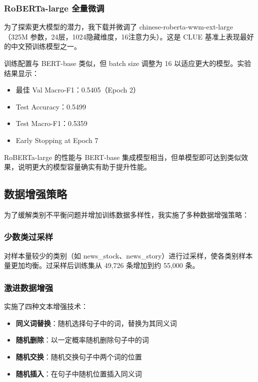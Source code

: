\documentclass[a4paper]{article}
\begin{document}
\subsubsection{RoBERTa-large 全量微调}

为了探索更大模型的潜力，我下载并微调了 chinese-roberta-wwm-ext-large（325M 参数，24层，1024隐藏维度，16注意力头）。这是 CLUE 基准上表现最好的中文预训练模型之一。

训练配置与 BERT-base 类似，但 batch size 调整为 16 以适应更大的模型。实验结果显示：
\begin{itemize}
    \item 最佳 Val Macro-F1：0.5405（Epoch 2）
    \item Test Accuracy：0.5499
    \item Test Macro-F1：0.5359
    \item Early Stopping at Epoch 7
\end{itemize}

RoBERTa-large 的性能与 BERT-base 集成模型相当，但单模型即可达到类似效果，说明更大的模型容量确实有助于提升性能。

\subsection{数据增强策略}

为了缓解类别不平衡问题并增加训练数据多样性，我实施了多种数据增强策略：

\subsubsection{少数类过采样}

对样本量较少的类别（如 news\_stock、news\_story）进行过采样，使各类别样本量更加均衡。过采样后训练集从 49,726 条增加到约 55,000 条。

\subsubsection{激进数据增强}

实施了四种文本增强技术：
\begin{itemize}
    \item \textbf{同义词替换}：随机选择句子中的词，替换为其同义词
    \item \textbf{随机删除}：以一定概率随机删除句子中的词
    \item \textbf{随机交换}：随机交换句子中两个词的位置
    \item \textbf{随机插入}：在句子中随机位置插入同义词
\end{itemize}
\end{document}
